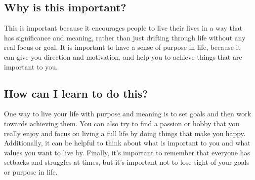 \documentclass[11pt]{article}
\begin{document}
\subsection{Why is this important?}
\label{sec:org51c13aa}
This is important because it encourages people to live their lives in a way that has significance and meaning, rather than just drifting through life without any real focus or goal. It is important to have a sense of purpose in life, because it can give you direction and motivation, and help you to achieve things that are important to you.

\subsection{How can I learn to do this?}
\label{sec:org1511002}
One way to live your life with purpose and meaning is to set goals and then work towards achieving them. You can also try to find a passion or hobby that you really enjoy and focus on living a full life by doing things that make you happy. Additionally, it can be helpful to think about what is important to you and what values you want to live by. Finally, it's important to remember that everyone has setbacks and struggles at times, but it's important not to lose sight of your goals or purpose in life.
\end{document}
